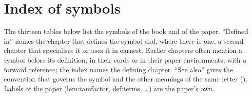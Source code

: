 \section{Index of symbols}\label{sec:notation:index}

The thirteen tables below list the symbols of the book and of the paper. ``Defined in'' names the chapter that defines the
symbol and, where there is one, a second chapter that specialises it or uses it in earnest.
Earlier chapters often mention a symbol before its definition, in their cards or in their paper environments, with a forward
reference; the index names the defining chapter. ``See also'' gives the convention that governs the symbol and the other
meanings of the same letter (). Labels of the paper (lem:tamfactor, def:terms, \dots) are the paper's
own.

